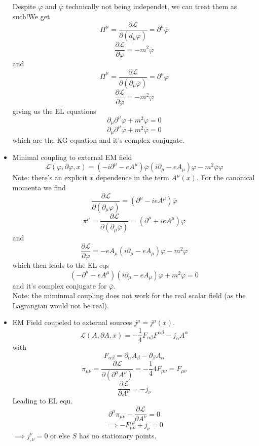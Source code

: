 \documentclass{report}
\begin{document}
\begin{itemize}
\[\] Despite $\varphi$ and $\overline{\varphi} $ technically not being independet, we can treat them as such!We get \[
\Pi^{\mu} = \frac{\partial \mathcal{L} }{\partial \left( d_\mu \varphi \right) } = \partial^{\mu} \overline{\varphi}  
\] \[
\frac{\partial \mathcal{L} }{\partial \varphi} = - m^2 \overline{\varphi} 
\] and \[
\overline{\Pi}^{\mu} = \frac{\partial \mathcal{L} }{\partial \left( \partial_\mu \overline{\varphi}  \right) }  = \partial^{\mu} \varphi 
\] \[
\frac{\partial \mathcal{L} }{\partial \overline{\varphi} } = -m^2 \varphi
\] giving us the EL equations \[
\partial_\mu \partial^{\mu} \varphi + m^2 \varphi = 0  
\] \[
\partial_\mu \partial^{\mu} \overline{\varphi} + m^2 \overline{\varphi} = 0  
\] which are the KG equation and it's complex conjugate.
\item Minimal coupling to external EM field \[
\mathcal{L} \left( \varphi, \partial\varphi, x \right) = \left( -i \partial^{\mu} - e A^{\mu}   \right) \overline{\varphi} \left( i \partial_\mu - e A_\mu \right) \varphi - m^2 \overline{\varphi} \varphi
\] Note: there's an explicit $x$ dependence in the term $A^{\mu} ( x )$. For the canonical momenta we find \[
\frac{\partial \mathcal{L} }{\partial \left( \partial_\mu \varphi \right) } = \left( \partial^{\mu} - ieA^{\mu} \right) \overline{\varphi} 
\] \[
\overline{\pi}^{\mu} = \frac{\partial \mathcal{L} }{\partial \left( \partial_\mu \overline{\varphi}  \right) } = \left( \partial^{\mu} + ie A^{\mu} \right) \varphi
\] and \[
\frac{\partial \mathcal{L} }{\partial \overline{\varphi} } = -eA_\mu \left( i \partial_\mu - eA_\mu \right) \varphi - m^2\varphi
\] which then leads to the EL eqs \[
\left( -\partial^{\mu} - eA^{\mu} \right) \left( i\partial_\mu - eA_\mu \right) \varphi + m^2\varphi = 0
\] and it's complex conjugate for $\overline{\varphi} $.\\
Note: the miminmal coupling does not work for the real scalar field (as the Lagrangian would not be real).
\item EM Field coupeled to external sources $j^{\mu} = j^{\mu}\left( x \right) $. \[
\mathcal{L} \left( A, \partial A , x \right) = - \frac{1}{4}  F_{\alpha \beta} F^{\alpha \beta} - j_\alpha A^{\alpha} 
\] with \[
F_{\alpha \beta} = \partial_\alpha A_\beta - \partial_\beta A_\alpha
\] \[
\pi_{\mu \nu} = \frac{\partial \mathcal{L} }{\partial \left( \partial^{\mu} A^{\nu} \right) } = -\frac{1}{4} 4 F_{\mu \nu} = F_{\mu \nu} 
\] \[
\frac{\partial \mathcal{L} }{\partial A^{\nu} } = - j_\nu
\] Leading to EL equ. \[
\partial^{\mu} \pi_{\mu \nu} - \frac{\partial \mathcal{L} }{\partial A^{\nu} } =0 
\] \[
\implies -F_{\mu\nu}^{,\mu} + j_\nu = 0
\] $\implies j^{\nu}_{,\nu} = 0$ or else $S$ has no stationary points.
\end{itemize}
\end{document}
